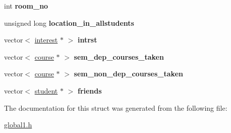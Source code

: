 \begin{DoxyCompactItemize}
\item 
\hypertarget{structstudent_aa7a4ce088b1e52df0a8d7cdf3296c146}{int {\bfseries room\-\_\-no}}\label{structstudent_aa7a4ce088b1e52df0a8d7cdf3296c146}

\item 
\hypertarget{structstudent_a9685664d51ee6f0cd5ff9041aa779710}{unsigned long {\bfseries location\-\_\-in\-\_\-allstudents}}\label{structstudent_a9685664d51ee6f0cd5ff9041aa779710}

\item 
\hypertarget{structstudent_a3e663b1978675c3d11bb30c92a6215c5}{vector$<$ \hyperlink{structinterest}{interest} $\ast$ $>$ {\bfseries intrst}}\label{structstudent_a3e663b1978675c3d11bb30c92a6215c5}

\item 
\hypertarget{structstudent_a9929ea200084c568045331ec6420ca2c}{vector$<$ \hyperlink{structcourse}{course} $\ast$ $>$ {\bfseries sem\-\_\-dep\-\_\-courses\-\_\-taken}}\label{structstudent_a9929ea200084c568045331ec6420ca2c}

\item 
\hypertarget{structstudent_afac7727e844ba1247fbecad1036c77b6}{vector$<$ \hyperlink{structcourse}{course} $\ast$ $>$ {\bfseries sem\-\_\-non\-\_\-dep\-\_\-courses\-\_\-taken}}\label{structstudent_afac7727e844ba1247fbecad1036c77b6}

\item 
\hypertarget{structstudent_a079b7684eece0f668823b5a0eb62d902}{vector$<$ \hyperlink{structstudent}{student} $\ast$ $>$ {\bfseries friends}}\label{structstudent_a079b7684eece0f668823b5a0eb62d902}

\end{DoxyCompactItemize}


\-The documentation for this struct was generated from the following file\-:\begin{DoxyCompactItemize}
\item 
\hyperlink{global1_8h}{global1.\-h}\end{DoxyCompactItemize}
